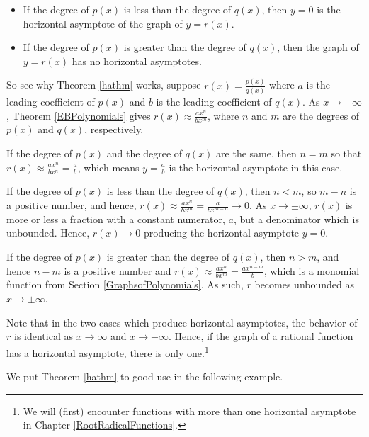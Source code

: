 \begin{ex}
\begin{tcolorbox}
\begin{thm}
\begin{itemize}
\item  If the degree of $p(x)$ is less than the degree of $q(x)$, then $y=0$ is the horizontal asymptote of the graph of $y=r(x)$.

\item  If the degree of $p(x)$ is greater than the degree of $q(x)$, then the graph of $y=r(x)$ has no horizontal asymptotes.


\end{itemize}
\end{thm}
\end{tcolorbox}
\smallskip

\end{ex}

So see why Theorem \ref{hathm} works, suppose $r(x) = \frac{p(x)}{q(x)}$ where $a$ is the leading coefficient of $p(x)$ and $b$ is the leading coefficient of $q(x)$. As $x \rightarrow \pm \infty$,  Theorem \ref{EBPolynomials} gives $r(x) \approx \frac{ax^n}{bx^m}$, where $n$ and $m$ are the degrees of $p(x)$ and $q(x)$, respectively. 

If the degree of $p(x)$ and the degree of $q(x)$ are the same, then $n=m$ so that $r(x) \approx \frac{ax^n}{bx^n} = \frac{a}{b}$, which means $y=\frac{a}{b}$ is the horizontal asymptote in this case.  

If the degree of $p(x)$ is less than the degree of $q(x)$, then $n < m$, so $m-n$ is a positive number, and hence, $r(x) \approx  \frac{ax^n}{bx^m}  = \frac{a}{bx^{m-n}} \rightarrow 0$.   As $x \rightarrow \pm \infty$, $r(x)$ is more or less a fraction with a constant numerator, $a$, but a denominator which is unbounded. Hence, $r(x) \rightarrow 0$ producing the horizontal asymptote $y = 0$.   

If the degree of $p(x)$ is greater than the degree of $q(x)$, then $n > m$, and hence $n-m$ is a positive number and $r(x) \approx  \frac{ax^n}{bx^m}  = \frac{ax^{n-m}}{ b}$, which is a monomial function from Section \ref{GraphsofPolynomials}.  As such, $r$ becomes unbounded as $x \rightarrow \pm \infty$.

Note that in the two cases which produce horizontal asymptotes, the behavior of $r$ is identical as $x \rightarrow \infty$ and $x \rightarrow -\infty$.  Hence, if the graph of a rational function has a horizontal asymptote, there is only one.\footnote{We will (first) encounter functions with more than one horizontal asymptote in Chapter \ref{RootRadicalFunctions}.} 

We put Theorem \ref{hathm}  to good use in the following example.
 
